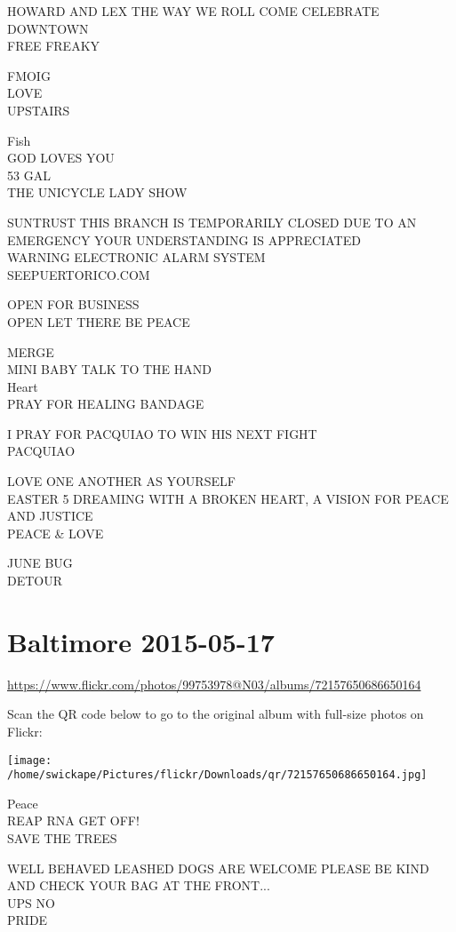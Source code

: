 \documentclass[10pt,letterpaper]{article}
\begin{document}
HOWARD AND LEX THE WAY WE ROLL COME CELEBRATE DOWNTOWN\\
FREE FREAKY

FMOIG\\
LOVE\\
UPSTAIRS

Fish\\
GOD LOVES YOU\\
53 GAL\\
THE UNICYCLE LADY SHOW

SUNTRUST THIS BRANCH IS TEMPORARILY CLOSED DUE TO AN EMERGENCY YOUR UNDERSTANDING IS APPRECIATED\\
WARNING ELECTRONIC ALARM SYSTEM\\
SEEPUERTORICO.COM

OPEN FOR BUSINESS\\
OPEN LET THERE BE PEACE

MERGE\\
MINI BABY TALK TO THE HAND\\
Heart\\
PRAY FOR HEALING BANDAGE

I PRAY FOR PACQUIAO TO WIN HIS NEXT FIGHT\\
PACQUIAO

LOVE ONE ANOTHER AS YOURSELF\\
EASTER 5 DREAMING WITH A BROKEN HEART, A VISION FOR PEACE AND JUSTICE\\
PEACE \& LOVE

JUNE BUG\\
DETOUR
\pagebreak

\section*{Baltimore 2015-05-17}

\url{https://www.flickr.com/photos/99753978@N03/albums/72157650686650164}

Scan the QR code below to go to the original album with full-size photos on Flickr:

\texttt{[image: /home/swickape/Pictures/flickr/Downloads/qr/72157650686650164.jpg]}
\pagebreak

Peace\\
REAP RNA GET OFF!\\
SAVE THE TREES

WELL BEHAVED LEASHED DOGS ARE WELCOME PLEASE BE KIND AND CHECK YOUR BAG AT THE FRONT...\\
UPS NO\\
PRIDE
\end{document}
